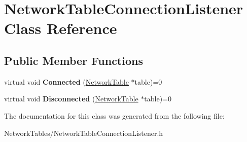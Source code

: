 \hypertarget{classNetworkTableConnectionListener}{
\section{NetworkTableConnectionListener Class Reference}
\label{classNetworkTableConnectionListener}
}
\subsection*{Public Member Functions}
\begin{DoxyCompactItemize}
\item 
\hypertarget{classNetworkTableConnectionListener_a9c519da80ee218fccb3b21a60ab1bcb2}{
virtual void {\bfseries Connected} (\hyperlink{classNetworkTable}{NetworkTable} $\ast$table)=0}
\label{classNetworkTableConnectionListener_a9c519da80ee218fccb3b21a60ab1bcb2}

\item 
\hypertarget{classNetworkTableConnectionListener_ae020cbbddb131bc4e653746c9292b28c}{
virtual void {\bfseries Disconnected} (\hyperlink{classNetworkTable}{NetworkTable} $\ast$table)=0}
\label{classNetworkTableConnectionListener_ae020cbbddb131bc4e653746c9292b28c}

\end{DoxyCompactItemize}


The documentation for this class was generated from the following file:\begin{DoxyCompactItemize}
\item 
NetworkTables/NetworkTableConnectionListener.h\end{DoxyCompactItemize}

